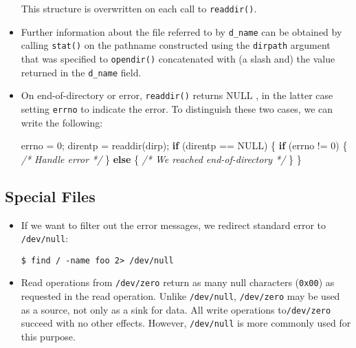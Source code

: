 \documentclass[]{article}
\newenvironment{Shaded}{}{}
\newcommand{\DecValTok}[1]{\textcolor[rgb]{0.25,0.63,0.44}{#1}}
\newcommand{\CommentTok}[1]{\textcolor[rgb]{0.38,0.63,0.69}{\textit{#1}}}
\newcommand{\ControlFlowTok}[1]{\textcolor[rgb]{0.00,0.44,0.13}{\textbf{#1}}}
\newcommand{\NormalTok}[1]{#1}
\begin{document}
\begin{itemize}
  This structure is overwritten on each call to \texttt{readdir()}.
\item
  Further information about the file referred to by \texttt{d\_name} can
  be obtained by calling \texttt{stat()} on the pathname constructed
  using the \texttt{dirpath} argument that was specified to
  \texttt{opendir()} concatenated with (a slash and) the value returned
  in the \texttt{d\_name} field.
\item
  On end-of-directory or error, \texttt{readdir()} returns NULL , in the
  latter case setting \texttt{errno} to indicate the error. To
  distinguish these two cases, we can write the following:

\begin{Shaded}
\begin{Highlighting}[]
\NormalTok{errno = }\DecValTok{0}\NormalTok{;}
\NormalTok{direntp = readdir(dirp);}
\ControlFlowTok{if}\NormalTok{ (direntp == NULL) \{}
    \ControlFlowTok{if}\NormalTok{ (errno != }\DecValTok{0}\NormalTok{) \{}
        \CommentTok{/* Handle error */}
\NormalTok{    \} }\ControlFlowTok{else}\NormalTok{ \{}
        \CommentTok{/* We reached end-of-directory */}
\NormalTok{    \}}
\NormalTok{\}}
\end{Highlighting}
\end{Shaded}
\end{itemize}

\subsection{\texorpdfstring{\textbf{Special
Files}}{Special Files}}\label{header-n359}

\begin{itemize}
\item
  If we want to filter out the error messages, we redirect standard
  error to \texttt{/dev/null}:

\begin{verbatim}
$ find / -name foo 2> /dev/null
\end{verbatim}
\end{itemize}

\begin{itemize}
\item
  Read operations from \texttt{/dev/zero} return as many null characters
  (\texttt{0x00}) as requested in the read operation. Unlike
  \texttt{/dev/null}, \texttt{/dev/zero} may be used as a source, not
  only as a sink for data. All write operations to\texttt{/dev/zero}
  succeed with no other effects. However, \texttt{/dev/null} is more
  commonly used for this purpose. 
\end{itemize}
\end{document}
